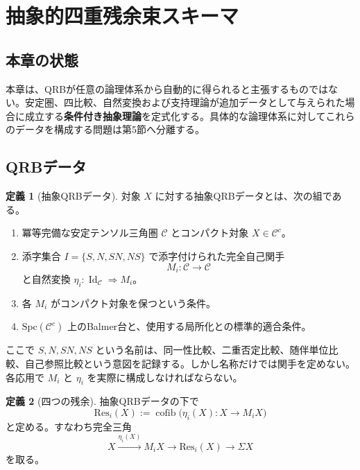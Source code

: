 \documentclass[a4paper,11pt]{ltjsarticle}
\theoremstyle{definition}
\newtheorem{definition}{定義}[section]
\theoremstyle{plain}
\newcommand{\Res}{\mathrm{Res}}
\newcommand{\cofib}{\operatorname{cofib}}
\newcommand{\Id}{\operatorname{Id}}
\newcommand{\Spc}{\mathrm{Spc}}
\begin{document}
\section{抽象的四重残余束スキーマ}

\subsection{本章の状態}

本章は、QRBが任意の論理体系から自動的に得られると主張するものではない。安定圏、四比較、自然変換および支持理論が追加データとして与えられた場合に成立する\textbf{条件付き抽象理論}を定式化する。具体的な論理体系に対してこれらのデータを構成する問題は第5節へ分離する。

\subsection{QRBデータ}

\begin{definition}[抽象QRBデータ]
対象 $X$ に対する抽象QRBデータとは、次の組である。
\begin{enumerate}
 \item 冪等完備な安定テンソル三角圏 $\mathcal C$ とコンパクト対象 $X\in\mathcal C^c$。
 \item 添字集合 $I=\{S,N,SN,NS\}$ で添字付けられた完全自己関手
 \begin{equation}
  M_i:\mathcal C\longrightarrow\mathcal C
 \end{equation}
 と自然変換 $\eta_i:\Id_{\mathcal C}\Rightarrow M_i$。
 \item 各 $M_i$ がコンパクト対象を保つという条件。
 \item $\Spc(\mathcal C^c)$ 上のBalmer台と、使用する局所化との標準的適合条件。
\end{enumerate}
\end{definition}

ここで $S,N,SN,NS$ という名前は、同一性比較、二重否定比較、随伴単位比較、自己参照比較という意図を記録する。しかし名称だけでは関手を定めない。各応用で $M_i$ と $\eta_i$ を実際に構成しなければならない。

\begin{definition}[四つの残余]
抽象QRBデータの下で
\begin{equation}
 \Res_i(X)
 :=\cofib\bigl(\eta_i(X):X\to M_iX\bigr)
 \label{eq:qrb-residual}
\end{equation}
と定める。すなわち完全三角
\begin{equation}
 X\xrightarrow{\eta_i(X)}M_iX
 \longrightarrow\Res_i(X)
 \longrightarrow\Sigma X
\end{equation}
を取る。
\end{definition}
\end{document}
